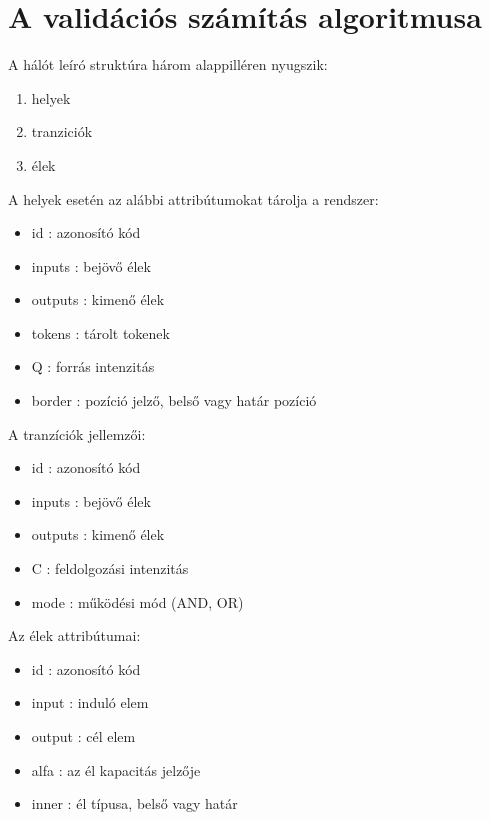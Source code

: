 \section{A validációs számítás algoritmusa}
A hálót leíró struktúra három alappilléren nyugszik:
\begin{enumerate}
\item helyek
\item tranziciók
\item élek
\end{enumerate}
A helyek esetén az alábbi attribútumokat tárolja a rendszer:
\begin{itemize}
\item id : azonosító kód
\item inputs : bejövő élek
\item outputs : kimenő élek
\item tokens : tárolt tokenek
\item Q : forrás intenzitás
\item border : pozíció jelző, belső vagy határ pozíció
\end{itemize}        
A tranzíciók jellemzői:
\begin{itemize}
\item id : azonosító kód 
\item inputs : bejövő élek
\item outputs : kimenő élek
\item C : feldolgozási intenzitás
\item mode : működési mód (AND, OR) 
\end{itemize}
Az élek attribútumai:
\begin{itemize}
\item id : azonosító kód 
\item input : induló elem
\item output : cél elem
\item alfa : az él kapacitás jelzője
\item inner : él típusa, belső vagy határ
\end{itemize}

